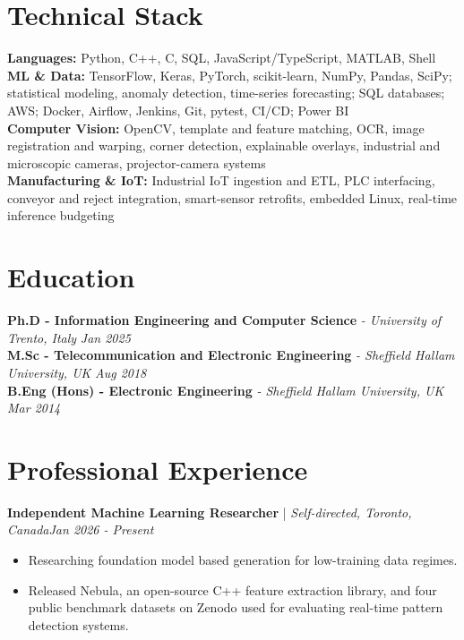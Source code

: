 \documentclass[11pt]{article}
\newenvironment{cvrole}[5]{%
  \par\noindent\textbf{\large #1} | \textit{\small #2, #3}\hfill \textit{\small #4 - #5}\par
  \begin{itemize}[leftmargin=2em, itemsep=-0.3em, topsep=-0.5em]%
}{%
  \end{itemize}\par\noindent\mbox{}\par\vspace{0.1em}%
}
\begin{document}
\section*{Technical Stack}

\textbf{Languages:} Python, C++, C, SQL, JavaScript/TypeScript, MATLAB, Shell\\
\textbf{ML \& Data:} TensorFlow, Keras, PyTorch, scikit-learn, NumPy, Pandas, SciPy; statistical modeling, anomaly detection, time-series forecasting; SQL databases; AWS; Docker, Airflow, Jenkins, Git, pytest, CI/CD; Power BI\\
\textbf{Computer Vision:} OpenCV, template and feature matching, OCR, image registration and warping, corner detection, explainable overlays, industrial and microscopic cameras, projector-camera systems\\
\textbf{Manufacturing \& IoT:} Industrial IoT ingestion and ETL, PLC interfacing, conveyor and reject integration, smart-sensor retrofits, embedded Linux, real-time inference budgeting

\section*{Education}
\textbf{Ph.D - Information Engineering and Computer Science} \textit{\small{ - University of Trento, Italy}} \hfill \textit{Jan 2025}\\[3pt]
\noindent\textbf{M.Sc - Telecommunication and Electronic Engineering} \textit{\small{ - Sheffield Hallam University, UK}} \hfill \textit{Aug 2018}\\[3pt]
\noindent\textbf{B.Eng (Hons) - Electronic Engineering} \textit{\small{ - Sheffield Hallam University, UK}} \hfill \textit{Mar 2014}


\section*{Professional Experience}

\begin{cvrole}{Independent Machine Learning Researcher}{Self-directed}{Toronto, Canada}{Jan 2026}{Present}
    \item Researching foundation model based generation for low-training data regimes.
    \item Released Nebula, an open-source C++ feature extraction library, and four public benchmark datasets on Zenodo used for evaluating real-time pattern detection systems. 
\end{cvrole}
\end{document}
